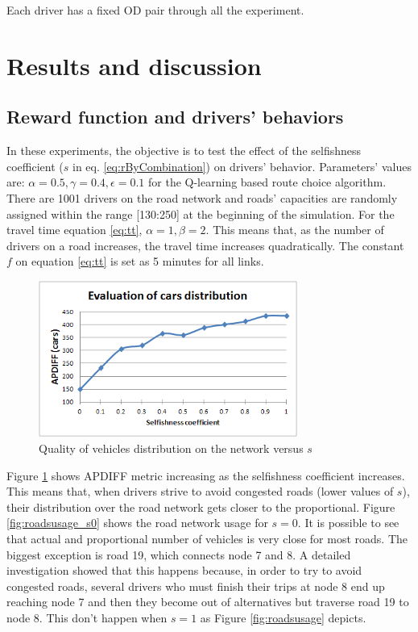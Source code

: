 \documentclass[12pt]{article}
\begin{document}
Each driver has a fixed OD pair through all the experiment.%

\section{Results and discussion}
\label{sec:results}


\subsection{Reward function and drivers' behaviors}
In these experiments, the objective is to test the effect of the selfishness coefficient ($s$ in eq. \eqref{eq:rByCombination}) on drivers' behavior. Parameters' values are: $\alpha = 0.5, \gamma = 0.4, \epsilon = 0.1$ for the Q-learning based route choice algorithm. There are 1001 drivers on the road network and roads' capacities are randomly assigned within the range [130:250] at the beginning of the simulation. For the travel time equation \eqref{eq:tt}, $\alpha = 1, \beta = 2$. This means that, as the number of drivers on a road increases, the travel time increases quadratically. The constant $f$ on equation \eqref{eq:tt} is set as 5 minutes for all links.

\begin{figure}[ht]
    \centerline{\includegraphics[width=8.5cm]{img/carsDistribVersusS.png}}
    \caption{Quality of vehicles distribution on the network versus $s$}
    \label{fig:apdiff}
\end{figure}

Figure \ref{fig:apdiff} shows APDIFF metric increasing as the selfishness coefficient increases. This means that, when drivers strive to avoid congested roads (lower values of $s$), their distribution over the road network gets closer to the proportional. Figure \ref{fig:roadsusage_s0} shows the road network usage for $s = 0$. It is possible to see that actual and proportional number of vehicles is very close for most roads. The biggest exception is road 19, which connects node 7 and 8. A detailed investigation showed that this happens because, in order to try to avoid congested roads, several drivers who must finish their trips at node 8 end up reaching node 7 and then they become out of alternatives but traverse road 19 to node 8. This don't happen when $s=1$ as Figure \ref{fig:roadsusage} depicts. 
\end{document}
